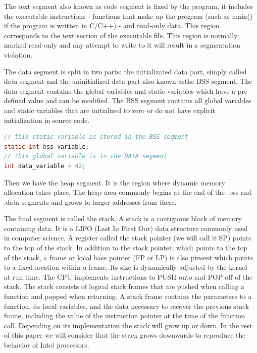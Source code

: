 \documentclass[10pt,twocolumn]{article}
\begin{document}
The text segment also known as code segment is fixed by the program, it
includes the executable instructions - functions that make up the program (such
as main() if the program is written in C/C++) - and read-only data. This region
corresponds to the text section of the executable file. This region is normally
marked read-only and any attempt to write to it will result in a segmentation
violation.

The data segment is split in two parts: the initializated data part, simply
called data segment and the uninitialized data part also known asthe BSS
segment. The data segment contains the global variables and static variables
which have a pre-defined value and can be modified. The BSS segment contains
all global variables and static variables that are initialized to zero or do
not have explicit initialization in source code.

\medskip
\begin{lstlisting}[caption=Variable location in memory,language=C] 
// this static variable is stored in the BSS segment
static int bss_variable;
// this global variable is in the DATA segment
int data_variable = 42; 
\end{lstlisting}

Then we have the heap segment. It is the region where dynamic memory allocation
takes place. The heap area commonly begins at the end of the .bss and .data
segments and grows to larger addresses from there.

The final segment is called the stack. A stack is a contiguous block of memory
containing data. It is a LIFO (Last In First Out) data structure commonly used
in computer science. A register called the stack pointer (we will call it SP)
points to the top of the stack. In addition to the stack pointer, which points
to the top of the stack, a frame or local base pointer (FP or LP) is also
present which points to a fixed location within a frame. Its size is
dynamically adjusted by the kernel at run time. The CPU implements instructions
to PUSH onto and POP off of the stack. The stack consists of logical stack
frames that are pushed when calling a function and popped when returning. A
stack frame contains the parameters to a function, its local variables, and the
data necessary to recover the previous stack frame, including the value of the
instruction pointer at the time of the function call. Depending on its
implementation the stack will grow up or down. In the rest of this paper we
will consider that the stack grows downwards to reproduce the behavior of Intel
processors.
\end{document}
